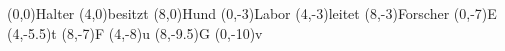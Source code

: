 \documentclass{article}
\begin{document}
\begin{erdiagram}[card symbols=crowsfoot]
  (0,0){Halter}
  (4,0){besitzt}
  (8,0){Hund}
  (0,-3){Labor}
  (4,-3){leitet}
  (8,-3){Forscher}
  (0,-7){E}
  (4,-5.5){t}
  (8,-7){F}
  (4,-8){u}
  (8,-9.5){G}
  (0,-10){v}
\end{erdiagram}
\end{document}
